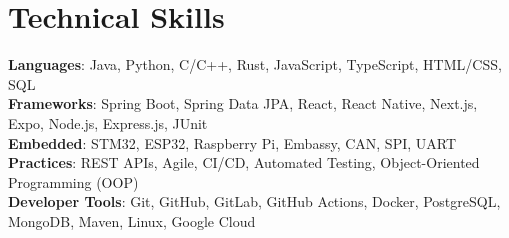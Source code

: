 \documentclass[letterpaper,11pt]{article}
\begin{document}
\section{Technical Skills}
 \begin{itemize}[leftmargin=0.15in, label={}]
    \small{\item{
     \textbf{Languages}{: Java, Python, C/C++, Rust, JavaScript, TypeScript, HTML/CSS, SQL} \\
     \textbf{Frameworks}{: Spring Boot, Spring Data JPA, React, React Native, Next.js, Expo, Node.js, Express.js, JUnit} \\
     \textbf{Embedded}{: STM32, ESP32, Raspberry Pi, Embassy, CAN, SPI, UART} \\
     \textbf{Practices}{: REST APIs, Agile, CI/CD, Automated Testing, Object-Oriented Programming (OOP)} \\
     \textbf{Developer Tools}{: Git, GitHub, GitLab, GitHub Actions, Docker, PostgreSQL, MongoDB, Maven, Linux, Google Cloud} \\
    }}
 \end{itemize}


\end{document}
